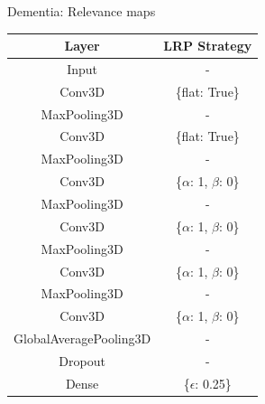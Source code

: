 \documentclass[c]{beamer}
\begin{document}
	\begin{frame}{Dementia: Relevance maps} %
		\renewcommand{\arraystretch}{0.8}
		\centering
		\vfill
		\begin{tabular}{|c|c|}
	        \hline
	        \tiny{\textbf{Layer}}&\tiny{\textbf{LRP Strategy}}\\
	        \hline
	        \tiny{Input}&\tiny{-}\\
	        \hline
	        \tiny{Conv3D}&\tiny{\{flat: True\}}\\
	        \hline
	        \tiny{MaxPooling3D}&\tiny{-}\\
	        \hline
	        \tiny{Conv3D}&\tiny{\{flat: True\}}\\
	        \hline
	        \tiny{MaxPooling3D}&\tiny{-}\\
	        \hline
	        \tiny{Conv3D}&\tiny{\{$\alpha$: 1, $\beta$: 0\}}\\
	        \hline
	        \tiny{MaxPooling3D}&\tiny{-}\\
	        \hline
	        \tiny{Conv3D}&\tiny{\{$\alpha$: 1, $\beta$: 0\}}\\
	        \hline
	        \tiny{MaxPooling3D}&\tiny{-}\\
	        \hline
	        \tiny{Conv3D}&\tiny{\{$\alpha$: 1, $\beta$: 0\}}\\
	        \hline
	        \tiny{MaxPooling3D}&\tiny{-}\\
	        \hline
	        \tiny{Conv3D}&\tiny{\{$\alpha$: 1, $\beta$: 0\}}\\
	        \hline
	        \tiny{GlobalAveragePooling3D}&\tiny{-}\\
	        \hline
	        \tiny{Dropout}&\tiny{-}\\
	        \hline
	        \tiny{Dense}&\tiny{\{$\epsilon$: 0.25\}}\\
	        \hline
	    \end{tabular}
	    \vfill
	\end{frame}
	
\end{document}
